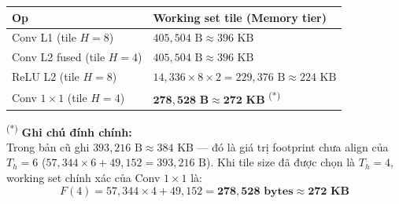 \documentclass[11pt,a4paper]{article}
\begin{document}
\begin{table}[H]
\centering
\begin{tabular}{ll}
\toprule
\textbf{Op} & \textbf{Working set tile (Memory tier)} \\
\midrule
Conv L1 (tile $H=8$)       & $405,504\text{ B} \approx 396\text{ KB}$ \\
Conv L2 fused (tile $H=4$) & $405,504\text{ B} \approx 396\text{ KB}$ \\
ReLU L2 (tile $H=8$)       & $14,336 \times 8 \times 2 = 229,376\text{ B} \approx 224\text{ KB}$ \\
Conv $1\times 1$ (tile $H=4$) & $\mathbf{278,528\text{ B} \approx 272\text{ KB}}$ \textsuperscript{(*)} \\
\bottomrule
\end{tabular}
\end{table}

\textsuperscript{(*)} \textbf{\textcolor{highlightblue}{Ghi chú đính chính:}} \\
Trong bản cũ ghi $393,216\text{ B} \approx 384\text{ KB}$ --- đó là giá trị footprint chưa align của $T_h = 6$ ($57,344 \times 6 + 49,152 = 393,216\text{ B}$). Khi tile size đã được chọn là $T_h = 4$, working set chính xác của Conv $1\times 1$ là:
$$F(4) = 57,344 \times 4 + 49,152 = \mathbf{278,528\text{ bytes}} \approx \mathbf{272\text{ KB}}$$
\end{document}
